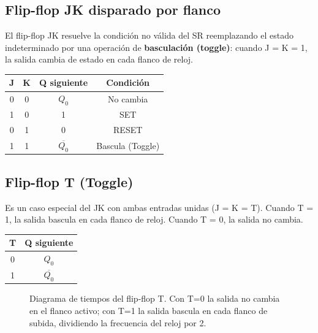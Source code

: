 \subsection{Flip-flop JK disparado por flanco}

El flip-flop JK resuelve la condición no válida del SR reemplazando el estado indeterminado por una operación de \textbf{basculación (toggle)}: cuando J = K = 1, la salida cambia de estado en cada flanco de reloj.

\begin{table}[H]
\centering
\begin{tabular}{cccc}
\toprule
J & K & Q siguiente & Condición \\
\midrule
0 & 0 & $Q_0$ & No cambia \\
1 & 0 & 1 & SET \\
0 & 1 & 0 & RESET \\
1 & 1 & $\overline{Q_0}$ & Bascula (Toggle) \\
\bottomrule
\end{tabular}
\end{table}


\subsection{Flip-flop T (Toggle)}

Es un caso especial del JK con ambas entradas unidas (J = K = T). Cuando T = 1, la salida bascula en cada flanco de reloj. Cuando T = 0, la salida no cambia.

\begin{table}[H]
\centering
\begin{tabular}{cc}
\toprule
T & Q siguiente \\
\midrule
0 & $Q_0$ \\
1 & $\overline{Q_0}$ \\
\bottomrule
\end{tabular}
\end{table}

\begin{figure}[H]
\centering

\caption{Diagrama de tiempos del flip-flop T. Con T=0 la salida no cambia
  en el flanco activo; con T=1 la salida bascula en cada flanco de subida,
  dividiendo la frecuencia del reloj por 2.}
\end{figure}

